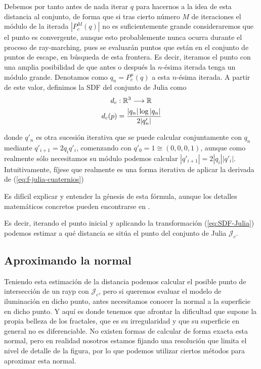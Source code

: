 Debemos por tanto antes de nada iterar $q$ para hacernos a la idea de esta distancia al conjunto, de forma que si tras cierto número $M$ de iteraciones el módulo de la iterada $|P_c^M(q)|$ no es suficientemente grande consideraremos que el punto es convergente, aunque esto probablemente nunca ocurra durante el proceso de ray-marching, pues se evaluarán puntos que están en el conjunto de puntos de escape, en búsqueda de esta frontera. Es decir, iteramos el punto con una amplia posibilidad de que antes o después la $n$-ésima iterada tenga un módulo grande. Denotamos como $q_n=P_c^n(q)$ a esta $n$-ésima iterada. A partir de este valor, definimos la SDF del conjunto de Julia como 
\begin{equation}
    \label{eq:SDF-Julia}
    \begin{split}
        d_c&:\mathbb{R}^3\longrightarrow\mathbb{R} \\
        d_c(p) &= \dfrac{|q_n|\log|q_n|}{2|q'_n|}
    \end{split}
\end{equation}

donde $q'_n$ es otra sucesión iterativa que se puede calcular conjuntamente con $q_n$ mediante $q'_{i+1}=2q_i q'_i$, comenzando con $q'_0=1\cong(0,0,0,1)$, aunque como realmente sólo necesitamos su módulo podemos calcular $|q'_{i+1}|=2|q_i||q'_i|$. Intuitivamente, fíjese que realmente es una forma iterativa de aplicar la derivada de (\ref{eq:f-julia-cuaternios})

Es difícil explicar y entender la génesis de esta fórmula, aunque los detalles matemáticos concretos pueden encontrarse en \cite[Capítulo 8]{Hubbard-Douady}. 

Es decir, iterando el punto inicial y aplicando la transformación (\ref{eq:SDF-Julia}) podemos estimar a qué distancia se sitúa el punto del conjunto de Julia $\mathcal{J}_c$.

\subsection{Aproximando la normal}

Teniendo esta estimación de la distancia podemos calcular el posible punto de intersección de un rayp con $\mathcal{J}_c$, pero si queremos evaluar el modelo de iluminación en dicho punto, antes necesitamos conocer la normal a la superficie en dicho punto. Y aquí es donde tenemos que afrontar la dificultad que supone la propia belleza de los fractales, que es su irregularidad y que su superficie en general no es diferenciable. No existen formas de calcular de forma exacta esta normal, pero en realidad nosotros estamos fijando una resolución que limita el nivel de detalle de la figura, por lo que podemos utilizar ciertos métodos para aproximar esta normal.


